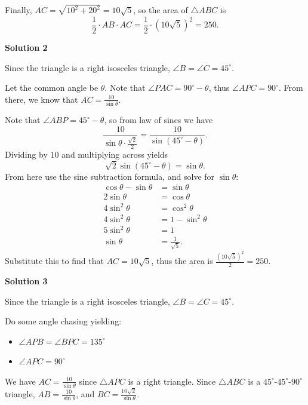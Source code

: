 \begin{enumerate}
 Finally, $AC=\sqrt{10^2+20^2}=10\sqrt{5}$, so the area of $\triangle ABC$ is 
 \[\frac12\cdot AB\cdot AC = \frac12\cdot (10\sqrt{5})^2 = \boxed{250}.\]




\textbf{Solution 2}

Since the triangle is a right isosceles triangle, $\angle B = \angle C = 45^\circ$.

 Let the common angle be $\theta$. Note that $\angle PAC = 90^\circ-\theta$, thus $\angle APC = 90^\circ$. From there, we know that $AC = \frac{10}{\sin\theta}$.

 Note that $\angle ABP = 45^\circ-\theta$, so from law of sines we have
 \[\frac{10}{\sin\theta \cdot \frac{\sqrt{2}}{2}}=\frac{10}{\sin(45^\circ-\theta)}.\]Dividing by $10$ and multiplying across yields
 \[\sqrt{2}\sin(45^\circ-\theta)=\sin\theta.\]From here use the sine subtraction formula, and solve for $\sin\theta$:
 \begin{align*} \cos\theta-\sin\theta&=\sin\theta \\ 2\sin\theta&=\cos\theta \\ 4\sin^2\theta&=\cos^2\theta \\ 4\sin^2\theta&=1-\sin^2\theta \\ 5\sin^2\theta&=1 \\ \sin\theta&=\frac{1}{\sqrt{5}}. \end{align*}
Substitute this to find that $AC=10\sqrt{5}$, thus the area is $\frac{(10\sqrt{5})^2}{2}=\boxed{250}$.

 



\textbf{Solution 3}

Since the triangle is a right isosceles triangle, $\angle B = \angle C = 45^\circ$.

 Do some angle chasing yielding:

 
            \begin{itemize}
        \item $\angle APB = \angle BPC = 135^\circ$
            \end{itemize}
            
            \begin{itemize}
        \item $\angle APC=90^\circ$
            \end{itemize}
            We have $AC=\frac{10}{\sin\theta}$ since $\triangle APC$ is a right triangle. Since $\triangle ABC$ is a $45^\circ$-$45^\circ$-$90^\circ$ triangle, $AB=\frac{10}{\sin\theta}$, and $BC=\frac{10\sqrt{2}}{\sin\theta}$. 


\end{enumerate}
